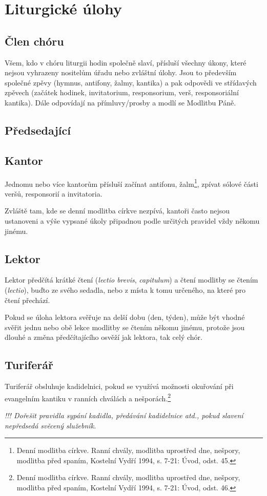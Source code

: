 \section{Liturgické úlohy}


\subsection{Člen chóru}

Všem, kdo v chóru liturgii hodin společně slaví, přísluší všechny úkony,
které nejsou vyhrazeny nositelům úřadu nebo zvláštní úlohy.
Jsou to především společné zpěvy 
(hymnus, antifony, žalmy, kantika)
a pak odpovědi ve střídavých zpěvech (začátek hodinek, invitatorium,
responsorium, verš, responsoriální kantika).
Dále odpovídají na přímluvy/prosby a modlí se Modlitbu Páně.

\subsection{Předsedající}
\subsection{Kantor}

Jednomu nebo více kantorům přísluší 
začínat antifonu, žalm\footnote{Denní modlitba církve. Ranní chvály, modlitba uprostřed dne, nešpory, modlitba před spaním, Kostelní Vydří 1994, s. 7-21: Úvod, odst. 45.},
zpívat sólové části veršů, responsorií a invitatoria.

Zvláště tam, kde se denní modlitba církve nezpívá, kantoři často
nejsou ustanoveni a výše vypsané úkoly připadnou podle určitých pravidel
vždy někomu jinému. 

\subsection{Lektor}

Lektor předčítá krátké čtení (\emph{lectio brevis}, \emph{capitulum}) 
a čtení modlitby se čtením (\emph{lectio}), buďto ze svého sedadla,
nebo z místa k tomu určeného, na které pro čtení přechází.

Pokud se úloha lektora svěřuje na delší dobu (den, týden), může být vhodné
svěřit jednu nebo obě lekce modlitby se čtením někomu jinému, protože jsou
dlouhé a změna předčítajícího osvěží jak lektora, tak celý chór.

\subsection{Turiferář}

Turiferář obsluhuje kadidelnici, pokud se využívá možnosti okuřování
při evangelním kantiku v ranních chválách a nešporách.\footnote{Denní modlitba církve. Ranní chvály, modlitba uprostřed dne, nešpory, modlitba před spaním, Kostelní Vydří 1994, s. 7-21: Úvod, odst. 46.}

\textsl{!!! Dořešit pravidla sypání kadidla, předávání kadidelnice atd.,
pokud slavení nepředsedá svěcený služebník.}
